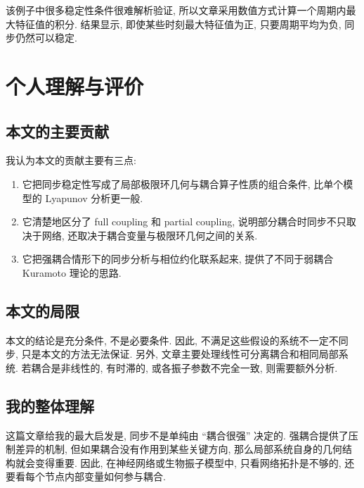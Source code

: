 \documentclass[oneside]{ctexart}
\begin{document}
该例子中很多稳定性条件很难解析验证, 所以文章采用数值方式计算一个周期内最大特征值的积分. 结果显示, 即使某些时刻最大特征值为正, 只要周期平均为负, 同步仍然可以稳定.

\section{个人理解与评价}

\subsection{本文的主要贡献}

我认为本文的贡献主要有三点:

\begin{enumerate}[(1)]
    \item 它把同步稳定性写成了局部极限环几何与耦合算子性质的组合条件, 比单个模型的 Lyapunov 分析更一般.
    \item 它清楚地区分了 full coupling 和 partial coupling, 说明部分耦合时同步不只取决于网络, 还取决于耦合变量与极限环几何之间的关系.
    \item 它把强耦合情形下的同步分析与相位约化联系起来, 提供了不同于弱耦合 Kuramoto 理论的思路.
\end{enumerate}

\subsection{本文的局限}

本文的结论是充分条件, 不是必要条件. 因此, 不满足这些假设的系统不一定不同步, 只是本文的方法无法保证. 另外, 文章主要处理线性可分离耦合和相同局部系统. 若耦合是非线性的, 有时滞的, 或各振子参数不完全一致, 则需要额外分析.

\subsection{我的整体理解}

这篇文章给我的最大启发是, 同步不是单纯由 ``耦合很强'' 决定的. 强耦合提供了压制差异的机制, 但如果耦合没有作用到某些关键方向, 那么局部系统自身的几何结构就会变得重要. 因此, 在神经网络或生物振子模型中, 只看网络拓扑是不够的, 还要看每个节点内部变量如何参与耦合.
\end{document}
